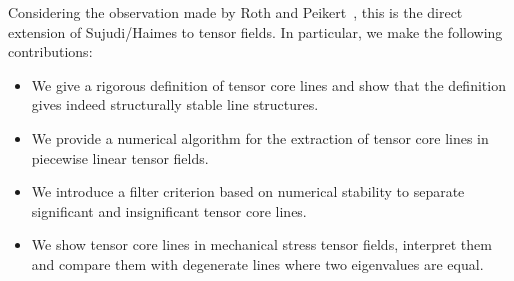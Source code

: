 %
Considering the observation made by Roth and Peikert~\cite{Roth1998}, this is
the direct extension of Sujudi/Haimes to tensor fields.
%
In particular, we make the following contributions:
%
\begin{itemize}
    \item  We give a rigorous definition of tensor core lines and show that the
    definition gives indeed structurally stable line structures.
    \item We provide a numerical algorithm for the extraction of tensor core
    lines in piecewise linear tensor fields.
    \item We introduce a filter criterion based on numerical stability to
    separate significant and insignificant tensor core lines.
    \item We show tensor core lines in mechanical stress tensor fields,
    interpret them and compare them with degenerate lines where two eigenvalues
    are equal.
\end{itemize}
%

%

